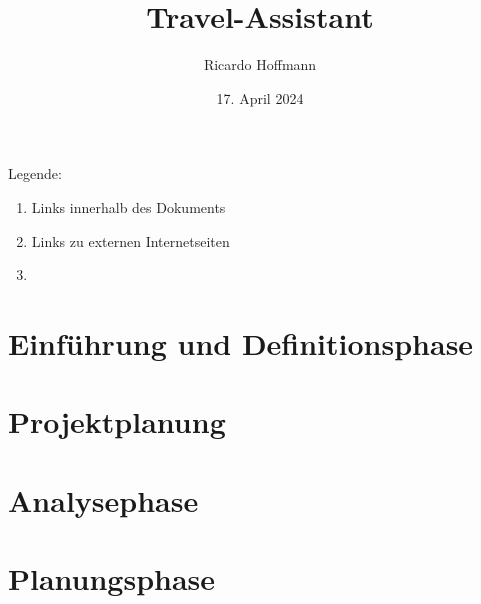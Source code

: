 \documentclass[11pt]{article}
\title{Travel-Assistant}
\author{Ricardo Hoffmann}
\date{17. April 2024}
\newcommand{\link}{\faLink}
\newcommand{\extlink}{\faExternalLink}
\begin{document}
\makeatletter
\let\doctitle\@title
\let\docauthor\@author
\let\docdate\@date
\makeatother




\tableofcontents

\vfill
Legende:
\begin{enumerate}
  \item \textcolor{link}{Links innerhalb des Dokuments \link}
  \item \textcolor{link}{Links zu externen Internetseiten \extlink}
  \item {} 
\end{enumerate}

\pagebreak

\setcounter{page}{4}

\setlength{\parskip}{0.2cm}

\pagestyle{scrheadings}

\ihead{\doctitle\\
\headmark}
\ifoot{\docauthor}
\ofoot{\pagemark}

\section{Einführung und Definitionsphase}
\label{sec:Einführung-Definitionsphase}


\section{Projektplanung}
\label{sec:Projektplanung}


\section{Analysephase}
\label{sec:Analysephase}


\section{Planungsphase}
\label{sec:Planungsphase}

\end{document}
